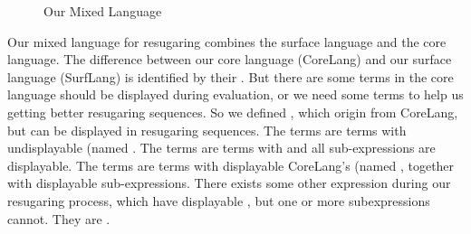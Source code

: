 \begin{figure}[t]
\begin{centering}
	\framebox[36em][c]{
		\parbox[t]{33em}{
			\[
			\begin{array}{lcl}
			\m{Exp} &::=& \m{DisplayableExp}\\
			&|& \m{UndisplayableExp}\\
\\
			\m{DisplayableExp} &::=& \m{SurfExp}\\
			&|& \m{CommonExp}
\\
			\m{UndisplayableExp} &::=& \m{Core'Exp}\\
			&|& \m{OtherSurfExp}\\
			&|& \m{OtherCommonExp}\\
\\
			\m{CoreHead} &::=& \m{CoreHead'}\\
						 &|& \m{CommonHead}\\
\\						
			\m{Core'Exp} &::=& (\m{CoreHead'}~\m{Exp}*)\\
\\
			\m{SurfExp} &::=& (\m{SurfHead}~\m{DisplayableExp}*)\\
\\
			\m{CommonExp} &::=& (\m{CommonHead}~\m{DisplayableExp}*)\\
			&|& c \qquad \note{// constant value}\\
			&|& x \qquad \note{// variable} \\
\\
			\m{OtherSurfExp} &::=& (\m{SurfHead}~\m{Exp}*~\m{UndisplayableExp}~\m{Exp}*)\\
\\
			\m{OtherCommonExp} &::=& (\m{CommonHead}~\m{Exp}*~\m{UndisplayableExp}~\m{Exp}*)
			\end{array}
			\]
		}
	}
\end{centering}
\caption{Our Mixed Language}
\label{fig:mix}
\end{figure}

Our mixed language for resugaring combines the surface language and the core language.
%
The difference between our core language (CoreLang) and our surface language (SurfLang) is identified by their . But there are some terms in the core language should be displayed during evaluation, or we need some terms to help us getting better resugaring sequences. So we defined , which origin from CoreLang, but can be displayed in resugaring sequences. The  terms are terms with undisplayable  (named . The  terms are terms with  and all sub-expressions are displayable. The  terms are terms with displayable CoreLang's  (named , together with displayable sub-expressions. There exists some other expression during our resugaring process, which have displayable , but one or more subexpressions cannot. They are .

